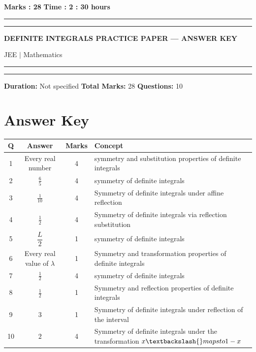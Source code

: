 \documentclass[11pt,a4paper]{article}
\begin{document}
\vspace{2mm}
\noindent \textbf{Marks : 28} \hfill \textbf{Time : 2 : 30 hours}
\noindent\rule{\linewidth}{1.1pt}\vspace{-1mm}\noindent\rule{\linewidth}{0.5pt}
{\centering \Large \textbf{DEFINITE INTEGRALS PRACTICE PAPER --- ANSWER KEY}\par}
{\centering JEE $|$ Mathematics\par}
\noindent\rule{\linewidth}{1.1pt}\vspace{-1mm}\noindent\rule{\linewidth}{0.5pt}
\vspace{1mm}
\noindent \textbf{Duration:} Not specified \quad \textbf{Total Marks:} 28 \quad \textbf{Questions:} 10\par
\vspace{2mm}

\section*{Answer Key}
\noindent\begin{tabularx}{\linewidth}{|c|c|c|X|}\hline
\textbf{Q} & \textbf{Answer} & \textbf{Marks} & \textbf{Concept} \\\hline
1 & Every real number & 4 & symmetry and substitution properties of definite integrals \\\hline
2 & $\frac{6}{5}$ & 4 & symmetry of definite integrals \\\hline
3 & $\frac{1}{10}$ & 4 & Symmetry of definite integrals under affine reflection \\\hline
4 & $\frac{1}{2}$ & 4 & Symmetry of definite integrals via reflection substitution \\\hline
5 & \(\dfrac{L}{2}\) & 1 & symmetry of definite integrals \\\hline
6 & Every real value of \(\lambda\) & 1 & Symmetry and transformation properties of definite integrals \\\hline
7 & \(\frac12\) & 4 & symmetry of definite integrals \\\hline
8 & $\frac{1}{2}$ & 1 & Symmetry and reflection properties of definite integrals \\\hline
9 & $3$ & 1 & Symmetry of definite integrals under reflection of the interval \\\hline
10 & $2$ & 4 & Symmetry of definite integrals under the transformation $x\textbackslash\{\}mapsto 1-x$ \\\hline
\end{tabularx}
\end{document}
